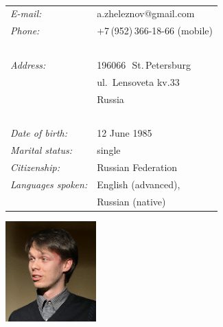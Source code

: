 \documentclass[a4paper,oneside,12pt]{article}
\begin{document}
\begin{centering}
\begin{minipage}{0.70\linewidth}%
\vspace{-1.5em}{\Huge\bfseries Alexander Zheleznov}

~\\[-1.5em]

\hspace{1.9em}\begin{tabularx}{\linewidth}{ll}
{\it E-mail:}		& a.zheleznov@gmail.com\\
{\it Phone:}	        & +7\,(952)\,366-18-66 (mobile)\\
~\\[-1.0em] 
{\it Address:}	    & 196066\,~St.\,Petersburg\\
                    & ul.~Lensoveta kv.33\\
                    & Russia\\

~\\[-1.0em]
{\it Date of birth:}	& 12 June 1985\\
{\it Marital status:}& single\\
{\it Citizenship:}   & Russian Federation\\
{\it Languages spoken:}& English (advanced),\\ 
		       &Russian (native)\\
\end{tabularx}
\end{minipage}
\begin{minipage}{0.23\linewidth}%
\begin{flushright}
\includegraphics[width=35mm]{me3.jpg}
{%
\setlength{\fboxsep}{0pt}%
\setlength{\fboxrule}{0pt}%
\fbox{
}
}%
\end{flushright}
\end{minipage}
\end{centering}
~\\[1.5em]
\end{document}
